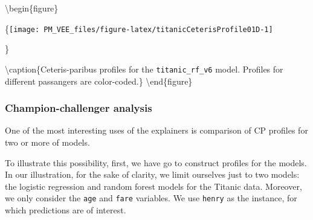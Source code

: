 \documentclass[12pt,]{krantz}
\newenvironment{Shaded}{\begin{snugshade}}{\end{snugshade}}
\newcommand{\DataTypeTok}[1]{\textcolor[rgb]{0.13,0.29,0.53}{#1}}
\newcommand{\DecValTok}[1]{\textcolor[rgb]{0.00,0.00,0.81}{#1}}
\newcommand{\KeywordTok}[1]{\textcolor[rgb]{0.13,0.29,0.53}{\textbf{#1}}}
\newcommand{\NormalTok}[1]{#1}
\newcommand{\OperatorTok}[1]{\textcolor[rgb]{0.81,0.36,0.00}{\textbf{#1}}}
\newcommand{\StringTok}[1]{\textcolor[rgb]{0.31,0.60,0.02}{#1}}
\begin{document}
\begin{Shaded}
\end{Shaded}

\textbackslash{}begin\{figure\}

\{\centering \texttt{[image: PM\_VEE\_files/figure-latex/titanicCeterisProfile01D-1]}

\}

\textbackslash{}caption\{Ceteris-paribus profiles for the \texttt{titanic\_rf\_v6} model. Profiles for different passangers are color-coded.\}\label{fig:titanicCeterisProfile01D}
\textbackslash{}end\{figure\}

\hypertarget{champion-challenger-analysis}{%
\subsubsection{Champion-challenger analysis}\label{champion-challenger-analysis}}

One of the most interesting uses of the explainers is comparison of CP profiles for two or more of models.

To illustrate this possibility, first, we have go to construct profiles for the models. In our illustration, for the sake of clarity, we limit ourselves just to two models: the logistic regression and random forest models for the Titanic data. Moreover, we only consider the \texttt{age} and \texttt{fare} variables. We use \texttt{henry} as the instance, for which predictions are of interest.
\end{document}
